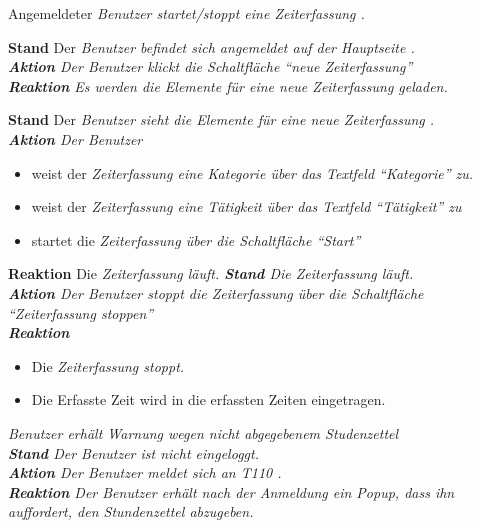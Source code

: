 \begin{requirements}
\begin{requirements}
	\end{requirements}
	 Angemeldeter \em Benutzer \em startet/stoppt eine \em Zeiterfassung \em.
	\begin{requirements}
            \textbf{Stand} Der \em Benutzer \em befindet sich angemeldet auf der \em Hauptseite \em. \\
            \textbf{Aktion} Der \em Benutzer \em klickt die Schaltfläche "`neue Zeiterfassung"' \\
            \textbf{Reaktion} Es werden die Elemente für eine neue \em Zeiterfassung \em geladen.
            \item
                \textbf{Stand} Der \em Benutzer \em sieht die Elemente für eine neue \em Zeiterfassung \em. \\
                \textbf{Aktion} Der \em Benutzer \em
                    \begin{itemize}
                        \item weist der \em Zeiterfassung \em eine \em Kategorie \em über das Textfeld "`Kategorie"' zu.
                        \item weist der \em Zeiterfassung \em eine \em Tätigkeit \em über das Textfeld "`Tätigkeit"' zu
                        \item startet die \em Zeiterfassung \em über die Schaltfläche "`Start"'
                    \end{itemize}
                \textbf{Reaktion} Die \em Zeiterfassung \em läuft.
            \textbf{Stand} Die \em Zeiterfassung \em läuft. \\
            \textbf{Aktion} Der \em Benutzer \em stoppt die \em Zeiterfassung \em über die Schaltfläche "`Zeiterfassung stoppen"' \\
            \textbf{Reaktion}
                \begin{itemize}
                    \item Die \em Zeiterfassung \em stoppt.
                    \item Die Erfasste Zeit wird in die erfassten Zeiten eingetragen.
                \end{itemize}
	\end{requirements}


	 \em Benutzer \em erhält \em Warnung \em wegen nicht abgegebenem \em Studenzettel \em \\
        \textbf{Stand} Der \em Benutzer \em ist nicht eingeloggt. \\
        \textbf{Aktion} Der \em Benutzer \em meldet sich an \em T110 \em. \\
        \textbf{Reaktion} Der \em Benutzer \em erhält nach der Anmeldung ein Popup, dass ihn auffordert, den \em Stundenzettel \em abzugeben.


\end{requirements}
